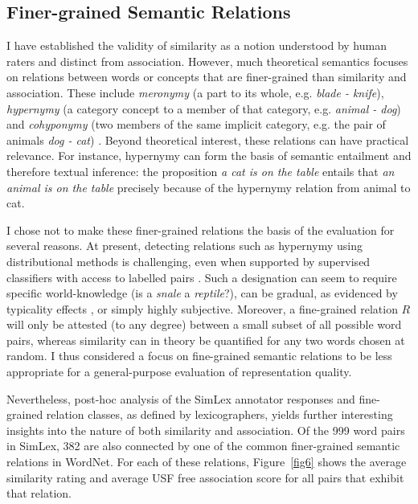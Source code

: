 \subsection{Finer-grained Semantic Relations}

I have established the validity of similarity as a notion understood by human raters and distinct from association. However, much theoretical semantics focuses on relations between words or concepts that are finer-grained than similarity and association. These include \emph{meronymy} (a part to its whole, e.g. \emph{blade - knife}), \emph{hypernymy} (a category concept to a member of that category, e.g. \emph{animal - dog}) and \emph{cohyponymy} (two members of the same implicit category, e.g. the pair of animals \emph{dog - cat}) \cite{cruse1986lexical}. Beyond theoretical interest, these relations can have practical relevance. For instance, hypernymy can form the basis of semantic entailment and therefore textual inference: the proposition \emph{a cat is on the table} entails that \emph{an animal is on the table} precisely because of the hypernymy relation from animal to cat. 

I chose not to make these finer-grained relations the basis of the evaluation for several reasons. At present, detecting relations such as hypernymy using distributional methods is challenging, even when supported by supervised classifiers with access to labelled pairs \cite{levy2015supervised}. Such a designation can seem to require specific world-knowledge (is a \emph{snale} a \emph{reptile}?), can be gradual, as evidenced by typicality effects \cite{rosch1976structural}, or simply highly subjective. Moreover, a fine-grained relation \(R\) will only be attested (to any degree) between a small subset of all possible word pairs, whereas similarity can in theory be quantified for any two words chosen at random. I thus considered a focus on fine-grained semantic relations to be less appropriate for a general-purpose evaluation of representation quality.  

Nevertheless, post-hoc analysis of the SimLex annotator responses and fine-grained relation classes, as defined by lexicographers, yields further interesting insights into the nature of both similarity and association. Of the 999 word pairs in SimLex, 382 are also connected by one of the common finer-grained semantic relations in WordNet. For each of these relations, Figure~\ref{fig6} shows the average similarity rating and average USF free association score for all pairs that exhibit that relation. 

